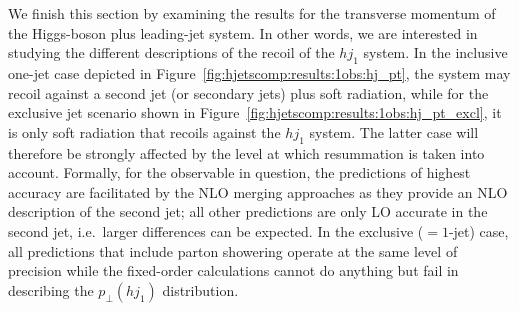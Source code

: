 We finish this section by examining the results for the transverse
momentum of the Higgs-boson plus leading-jet system. In other words,
we are interested in studying the different descriptions of the
recoil of the $hj_1$ system. In the inclusive one-jet case depicted in
Figure~\ref{fig:hjetscomp:results:1obs:hj_pt}, the system may recoil
against a second jet (or secondary jets) plus soft radiation, while
for the exclusive jet scenario shown in
Figure~\ref{fig:hjetscomp:results:1obs:hj_pt_excl}, it is only soft
radiation that recoils against the $hj_1$ system. The latter case will
therefore be strongly affected by the level at which resummation is
taken into account. Formally, for the observable in question, the
predictions of highest accuracy are facilitated by the NLO merging
approaches as they provide an NLO description of the second jet; all
other predictions are only LO accurate in the second jet, i.e.~larger
differences can be expected. In the exclusive ($=1$-jet) case, all
predictions that include parton showering operate at the same level of
precision while the fixed-order calculations cannot do anything but
fail in describing the $p_\perp(hj_1)$ distribution.

